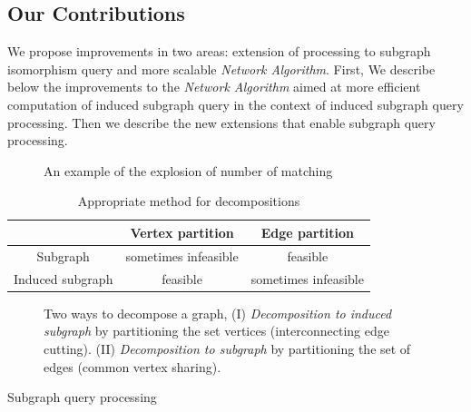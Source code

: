 \subsection{Our Contributions}

We propose improvements in two areas: extension of processing to subgraph isomorphism query and more scalable \textit{Network Algorithm}. First, We describe below the improvements to the \textit{Network Algorithm} aimed at more efficient computation of induced subgraph query in the context of induced subgraph query processing. Then we describe the new extensions that enable subgraph query processing. 


\begin{figure}
        \centering
        
        \caption{An example of the explosion of number of matching \label{fig:fig3} }
\end{figure}

\begin{table}
\begin{center}\begin{tabular}{|c|c|c|}
\hline
  & Vertex partition  & Edge partition  \\ \hline
Subgraph & sometimes infeasible  & feasible \\ \hline
Induced subgraph & feasible & sometimes  infeasible \\ \hline
\end{tabular}
\caption{Appropriate method for decompositions \label{tab:table1} }
\end{center}
\end{table}

\begin{figure}
\centering

\caption{Two ways to decompose a graph, (I) \textit{Decomposition to induced subgraph} by partitioning the set vertices (interconnecting edge cutting). (II) \textit{Decomposition to subgraph} by partitioning the set of edges (common vertex sharing).}
\label{fig:fig4}
\end{figure}

\item Subgraph query processing

